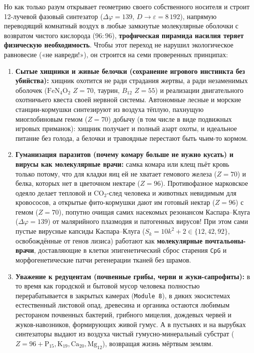 Но как только разум открывает геометрию своего собственного носителя и строит 12-лучевой фазовый синтезатор ($\Delta\varphi = 139$, $D\to\varepsilon = 8\,192$), напрямую переводящий комнатный воздух в любые замкнутые молекулярные оболочки с возвратом чистого кислорода ($96 : 96$), \textbf{трофическая пирамида насилия теряет физическую необходимость}. Чтобы этот переход не нарушил экологическое равновесие («не навреди!»), он строится на семи проверенных принципах:

\begin{enumerate}[label=\textbf{\arabic*.},leftmargin=*]
\item \textbf{Сытые хищники и живые белочки (сохранение игрового инстинкта без убийства):}
  хищник охотится не ради страдания жертвы, а ради незаменимых оболочек ($\mathrm{FeN_4O_2}$ $Z=70$, таурин, $B_{12}$ $Z=55$) и реализации двигательного охотничьего квеста своей нервной системы. Автономные лесные и морские станции-кормушки синтезируют из воздуха тёплую, пахнущую миоглобиновым гемом ($Z=70$) добычу (в том числе в виде подвижных игровых приманок): хищник получает и полный азарт охоты, и идеальное питание без голода, а белочки и травоядные перестают быть чьим-то кормом.
\item \textbf{Гуманизация паразитов (почему комару больше не нужно кусать) и вирусы как молекулярные врачи:}
  самка комара или клещ пьёт кровь только потому, что для кладки яиц ей не хватает гемового железа ($Z=70$) и белка, которых нет в цветочном нектаре ($Z=96$). Противофазное марковское одеяло делает тепловой и $\mathrm{CO_2}$-след человека и животных невидимым для кровососов, а открытые фито-кормушки дают им готовый нектар ($Z=96$) с гемом ($Z=70$), попутно очищая самих насекомых резонансом Каспара--Клуга ($\Delta\varphi = 139$) от малярийного плазмодия и патогенных вирусов! При этом сами пустые вирусные капсиды Каспара--Клуга ($S_k = 10k^2 + 2 \in \{12, 42, 92\}$, освобождённые от генов лизиса) работают как \textbf{молекулярные почтальоны-врачи}, доставляющие в клетки эпигенетический сброс старения \texttt{CpG} и морфогенетические патчи регенерации тканей без шрамов.
\item \textbf{Уважение к редуцентам (почвенные грибы, черви и жуки-сапрофиты):}
  в то время как городской и бытовой мусор человека полностью перерабатывается в закрытых камерах (\texttt{Module~8}), в диких экосистемах естественный листовой опад, древесина и органика остаются любимым рестораном почвенных бактерий, грибного мицелия, дождевых червей и жуков-навозников, формирующих живой гумус. А в пустынях и на вырубках синтезаторы выдают из воздуха чистый гумусно-минеральный субстрат ($Z=96 + \mathrm{P}_{15}, \mathrm{K}_{19}, \mathrm{Ca}_{20}, \mathrm{Mg}_{12}$), возвращая жизнь мёртвым землям.

\end{enumerate}
